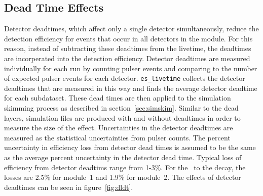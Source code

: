 \documentclass[/main.tex]{subfiles}
\begin{document}
\subsection{Dead Time Effects} \label{sec:DT}
Detector deadtimes, which affect only a single detector simultaneously, reduce the detection efficiency for events that occur in all detectors in the module.
For this reason, instead of subtracting these deadtimes from the livetime, the deadtimes are incorperated into the detection efficiency.
Detector deadtimes are measured individually for each run by counting pulser events and comparing to the number of expected pulser events for each detector.
\texttt{es\_livetime} collects the detector deadtimes that are measured in this way and finds the average detector deadtime for each subdataset.
These dead times are then applied to the simulation skimming process as described in section~\ref{sec:simskim}.
Similar to the dead layers, simulation files are produced with and without deadtimes in order to measure the size of the effect.
Uncertainties in the detector deadtimes are measured as the statistical uncertainties from pulser counts.
The percent uncertainty in efficiency loss from detector dead times is assumed to be the same as the average percent uncertainty in the detector dead time.
Typical loss of efficiency from detector deadtims range from 1-3\%.
For the \tnbb\ to the  decay, the losses are 2.5\% for module~1 and 1.9\% for module~2.
The effects of detector deadtimes can be seen in figure~\ref{fig:dldt}.
\\
\end{document}
